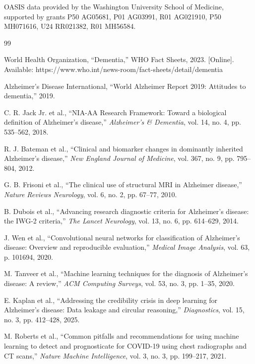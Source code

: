 \documentclass[conference]{IEEEtran}
\begin{document}
OASIS data provided by the Washington University School of Medicine, supported by grants P50 AG05681, P01 AG03991, R01 AG021910, P50 MH071616, U24 RR021382, R01 MH56584.

\begin{thebibliography}{99}

World Health Organization, ``Dementia,'' WHO Fact Sheets, 2023. [Online]. Available: https://www.who.int/news-room/fact-sheets/detail/dementia

Alzheimer's Disease International, ``World Alzheimer Report 2019: Attitudes to dementia,'' 2019.

C. R. Jack Jr. et al., ``NIA-AA Research Framework: Toward a biological definition of Alzheimer's disease,'' \textit{Alzheimer's \& Dementia}, vol. 14, no. 4, pp. 535--562, 2018.

R. J. Bateman et al., ``Clinical and biomarker changes in dominantly inherited Alzheimer's disease,'' \textit{New England Journal of Medicine}, vol. 367, no. 9, pp. 795--804, 2012.

G. B. Frisoni et al., ``The clinical use of structural MRI in Alzheimer disease,'' \textit{Nature Reviews Neurology}, vol. 6, no. 2, pp. 67--77, 2010.

B. Dubois et al., ``Advancing research diagnostic criteria for Alzheimer's disease: the IWG-2 criteria,'' \textit{The Lancet Neurology}, vol. 13, no. 6, pp. 614--629, 2014.

J. Wen et al., ``Convolutional neural networks for classification of Alzheimer's disease: Overview and reproducible evaluation,'' \textit{Medical Image Analysis}, vol. 63, p. 101694, 2020.

M. Tanveer et al., ``Machine learning techniques for the diagnosis of Alzheimer's disease: A review,'' \textit{ACM Computing Surveys}, vol. 53, no. 3, pp. 1--35, 2020.

E. Kaplan et al., ``Addressing the credibility crisis in deep learning for Alzheimer's disease: Data leakage and circular reasoning,'' \textit{Diagnostics}, vol. 15, no. 3, pp. 412--428, 2025.

M. Roberts et al., ``Common pitfalls and recommendations for using machine learning to detect and prognosticate for COVID-19 using chest radiographs and CT scans,'' \textit{Nature Machine Intelligence}, vol. 3, no. 3, pp. 199--217, 2021.


\end{thebibliography}
\end{document}
